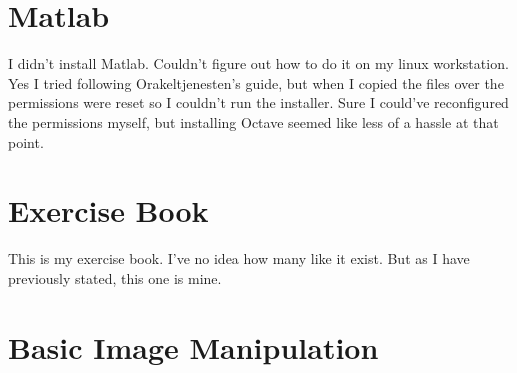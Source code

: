 \section{Matlab}
I didn't install Matlab.
Couldn't figure out how to do it on my linux workstation.
Yes I tried following Orakeltjenesten's guide, but when I copied the files over the permissions were reset so I couldn't run the installer.
Sure I could've reconfigured the permissions myself, but installing Octave seemed like less of a hassle at that point.

\section{Exercise Book}
This is my exercise book.
I've no idea how many like it exist.
But as I have previously stated, this one is mine.

\section{Basic Image Manipulation}


